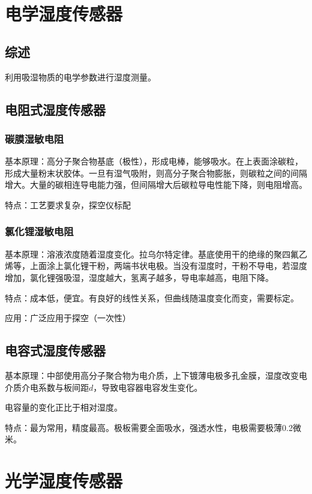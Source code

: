 \documentclass[UTF8,11pt]{ctexbook}
\begin{document}
\section{电学湿度传感器}

\subsection{综述}

利用吸湿物质的电学参数进行湿度测量。

\subsection{电阻式湿度传感器}

\subsubsection{碳膜湿敏电阻}

基本原理：高分子聚合物基底（极性），形成电棒，能够吸水。在上表面涂碳粒，形成大量粉末状胶体。一旦有湿气吸附，则高分子聚合物膨胀，则碳粒之间的间隔增大。大量的碳相连导电能力强，但间隔增大后碳粒导电性能下降，则电阻增高。

特点：工艺要求复杂，探空仪标配

\subsubsection{氯化锂湿敏电阻}

基本原理：溶液浓度随着湿度变化。拉乌尔特定律。基底使用干的绝缘的聚四氟乙烯等，上面涂上氯化锂干粉，两端书状电极。当没有湿度时，干粉不导电，若湿度增加，氯化锂强吸湿，湿度越大，氢离子越多，导电率越高，电阻下降。

特点：成本低，便宜。有良好的线性关系，但曲线随温度变化而变，需要标定。

应用：广泛应用于探空（一次性）

\subsection{电容式湿度传感器}

基本原理：中部使用高分子聚合物为电介质，上下镀薄电极多孔金膜，湿度改变电介质介电系数与板间距\(d\)，导致电容器电容发生变化。

电容量的变化正比于相对湿度。

特点：最为常用，精度最高。极板需要全面吸水，强透水性，电极需要极薄0.2微米。

\section{光学湿度传感器}
\end{document}
